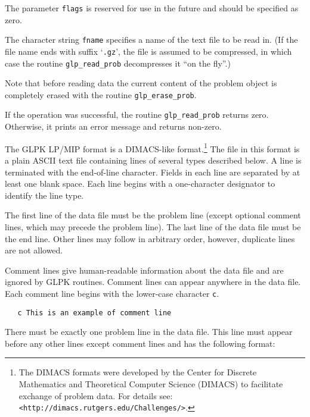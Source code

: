 The parameter \verb|flags| is reserved for use in the future and should
be specified as zero.

The character string \verb|fname| specifies a name of the text file to
be read in. (If the file name ends with suffix `\verb|.gz|', the file
is assumed to be compressed, in which case the routine
\verb|glp_read_prob| decompresses it ``on the fly''.)

Note that before reading data the current content of the problem object
is completely erased with the routine \verb|glp_erase_prob|.

\returns

If the operation was successful, the routine \verb|glp_read_prob|
returns zero. Otherwise, it prints an error message and returns
non-zero.



The GLPK LP/MIP format is a DIMACS-like format.\footnote{The DIMACS
formats were developed by the Center for Discrete Mathematics and
Theoretical Computer Science (DIMACS) to facilitate exchange of problem
data. For details see: {\tt <http://dimacs.rutgers.edu/Challenges/>}. }
The file in this format is a plain ASCII text file containing lines of
several types described below. A line is terminated with the
end-of-line character. Fields in each line are separated by at least
one blank space. Each line begins with a one-character designator to
identify the line type.

\newpage

The first line of the data file must be the problem line (except
optional comment lines, which may precede the problem line). The last
line of the data file must be the end line. Other lines may follow in
arbitrary order, however, duplicate lines are not allowed.

 Comment lines give human-readable
information about the data file and are ignored by GLPK routines.
Comment lines can appear anywhere in the data file. Each comment line
begins with the lower-case character \verb|c|.

\begin{verbatim}
   c This is an example of comment line
\end{verbatim}

 There must be exactly one problem line in the
data file. This line must appear before any other lines except comment
lines and has the following format:

